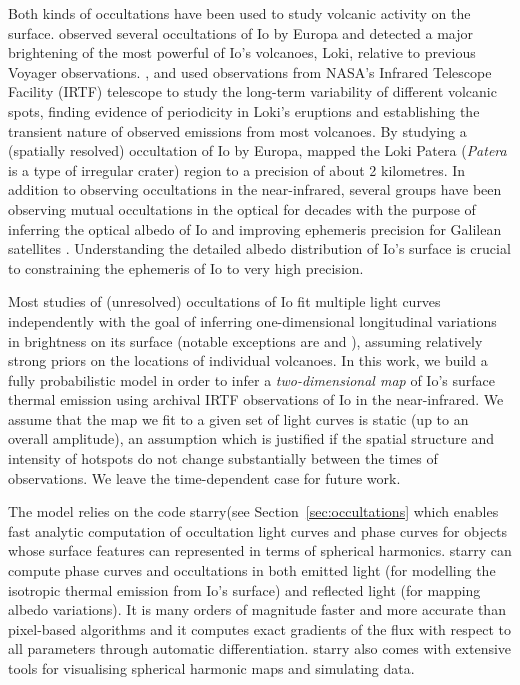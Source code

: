 \documentclass[12pt,dvipsnames]{report}
\begin{document}
Both kinds of occultations have been used to study volcanic activity on the surface.
\citet{1994Icar..107..195S} observed several occultations of Io by Europa and detected a major 
brightening of the most powerful of Io's volcanoes, Loki, relative to previous Voyager 
observations.
\citet{2002GeoRL..29.1443R}, \citet{2006GeoRL..3317201R} and \citet{2010Icar..209..625R}
 used observations from NASA's 
Infrared Telescope Facility (IRTF) telescope to study the long-term variability of 
different volcanic spots, finding evidence of periodicity in Loki's eruptions and 
establishing the transient nature of observed emissions from most volcanoes. 
By studying a (spatially resolved) occultation of Io by Europa, \citet{2017Natur.545..199D} 
mapped the Loki Patera (\emph{Patera} is a type of irregular crater) region to a 
precision of about 2 kilometres.
In addition to observing occultations in the near-infrared, several groups have been 
observing mutual occultations in the optical for decades with the purpose of inferring 
the optical albedo of Io and improving ephemeris precision for Galilean satellites 
\citep[][and references therein]{1974A&A....35..115A,2009Natur.459..957L,2018MNRAS.474.4730S,2016MNRAS.460.4086M}.
Understanding the detailed albedo distribution of Io's surface is crucial to 
constraining the ephemeris of Io to very high precision.

Most studies of (unresolved) occultations of Io fit multiple light curves independently 
with the goal of inferring one-dimensional longitudinal variations in brightness on 
its surface (notable exceptions are \citet{1994Icar..107..195S} and 
\citet{2017Natur.545..199D}), assuming relatively strong priors on the locations of 
individual volcanoes.
In this work, we build a fully probabilistic model in order to infer a 
\emph{two-dimensional map} of Io's surface thermal emission using archival IRTF 
observations of Io in the near-infrared. We assume that the map we fit to a given set 
of light curves is static (up to an overall amplitude), an assumption which is 
justified if the spatial structure and intensity of hotspots do not change substantially  
between the times of observations. We leave the time-dependent case for future work.

The model relies on the code \textsf{starry}(see Section~\ref{sec:occultations} 
which enables fast analytic computation 
of occultation light curves and phase curves for objects whose surface features can 
represented in terms of spherical harmonics.
\textsf{starry} can compute phase curves and occultations in both emitted light (for 
modelling the isotropic thermal emission from Io's surface) and reflected light (for 
mapping albedo variations).
It is many orders of magnitude faster and more accurate than pixel-based algorithms 
and it computes exact gradients of the flux with respect to all parameters through 
automatic differentiation.
\textsf{starry} also comes with extensive tools for visualising spherical harmonic 
maps and simulating data.
\end{document}
